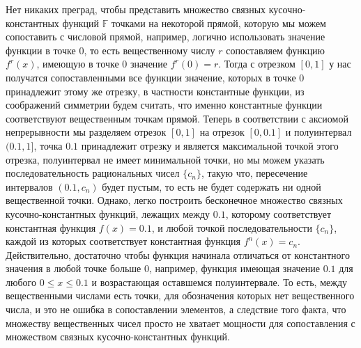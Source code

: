 \documentclass[12pt]{article}
\begin{document}
Нет никаких преград, чтобы представить множество связных кусочно-константных функций $\mathbb{F}$ точками на некоторой прямой, которую мы можем сопоставить с числовой прямой, например, логично использовать значение функции в точке $0$, то есть вещественному числу $r$ сопоставляем функцию $f^r(x)$, имеющую в точке $0$ значение $f^r(0) = r$. Тогда с отрезком $[0, 1]$ у нас получатся сопоставленными все функции значение, которых в точке $0$ принадлежит этому же отрезку, в частности константные функции, из соображений симметрии будем считать, что именно константные функции соответствуют вещественным точкам прямой. Теперь в соответствии с аксиомой непрерывности мы разделяем отрезок $[0, 1]$ на отрезок $[0, 0.1]$ и полуинтервал $(0.1, 1]$, точка $0.1$ принадлежит отрезку и является максимальной точкой этого отрезка, полуинтервал не имеет минимальной точки, но мы можем указать последовательность рациональных чисел $\{c_n\}$, такую что, пересечение интервалов $(0.1, c_n)$ будет пустым, то есть не будет содержать ни одной вещественной точки. Однако, легко построить бесконечное множество связных кусочно-константных функций, лежащих между $0.1$, которому соответствует константная функция $f(x) = 0.1$, и любой точкой последовательности $\{c_n\}$, каждой из которых соответствует константная функция $f^n(x) = c_n$. Действительно, достаточно чтобы функция начинала отличаться от константного значения в любой точке больше $0$, например, функция имеющая значение $0.1$ для любого $0 \leq x \leq 0.1$ и возрастающая оставшемся полуинтервале. То есть, между вещественными числами есть точки, для обозначения которых нет вещественного числа, и это не ошибка в сопоставлении элементов, а следствие того факта, что множеству вещественных чисел просто не хватает мощности для сопоставления с множеством связных кусочно-константных функций. 
\end{document}
